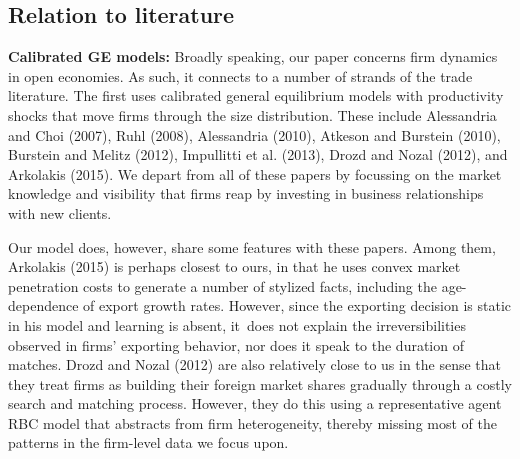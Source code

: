 \documentclass[12pt]{article}
\begin{document}
\subsection{Relation to literature}

\textbf{Calibrated GE models:} Broadly speaking, our paper concerns firm
dynamics in open economies. As such, it connects to a number of strands of
the trade literature. The first uses calibrated general equilibrium models
with productivity shocks that move firms through the size distribution.
These include Alessandria and Choi (2007), Ruhl (2008), Alessandria (2010),
Atkeson and Burstein (2010), Burstein and Melitz (2012), Impullitti et al.
(2013), Drozd and Nozal (2012), and Arkolakis (2015). We depart from all of
these papers by focussing on the market knowledge and visibility that firms
reap by investing in business relationships with new clients.

Our model does, however, share some features with these papers. Among them,
Arkolakis (2015) is perhaps closest to ours, in that he uses convex market
penetration costs to generate a number of stylized facts, including the
age-dependence of export growth rates. However, since the exporting decision
is static in his model and learning is absent, it\ does not explain the
irreversibilities observed in firms' exporting behavior, nor does it speak
to the duration of matches. Drozd and Nozal (2012) are also relatively close
to us in the sense that they treat firms as building their foreign market
shares gradually through a costly search and matching process. However, they
do this using a representative agent RBC model that abstracts from firm
heterogeneity, thereby missing most of the patterns in the firm-level data
we focus upon.
\end{document}

